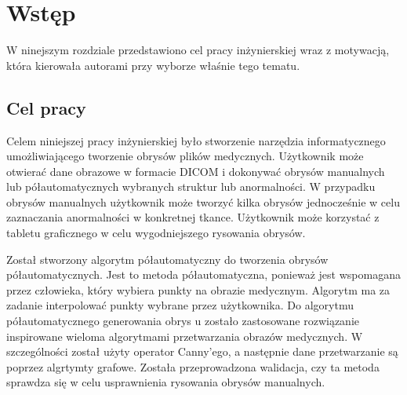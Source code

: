 \documentclass[a4paper,11pt,twoside,openright]{report}
\theoremstyle{definition}
\begin{document}
\thispagestyle{empty}
\newpage

\null\thispagestyle{empty}\newpage


\tableofcontents
\thispagestyle{empty}


\null\thispagestyle{empty}\newpage
\pagestyle{fancy}
\setcounter{page}{11} %

\chapter*{Wstęp}

W ninejszym rozdziale przedstawiono cel pracy inżynierskiej wraz z motywacją,
która kierowała autorami przy wyborze właśnie tego tematu.

\section*{Cel pracy}

Celem niniejszej pracy inżynierskiej było stworzenie narzędzia informatycznego
umożliwiającego tworzenie obrysów plików medycznych. Użytkownik może otwierać
dane obrazowe w formacie DICOM i dokonywać obrysów manualnych lub półautomatycznych
wybranych struktur lub anormalności. W przypadku obrysów manualnych użytkownik
może tworzyć kilka obrysów jednocześnie w celu zaznaczania anormalności w konkretnej tkance.
Użytkownik może korzystać z tabletu graficznego w celu wygodniejszego rysowania obrysów.

Został stworzony algorytm półautomatyczny do tworzenia obrysów półautomatycznych.
Jest to metoda półautomatyczna, ponieważ jest wspomagana przez człowieka, który
wybiera punkty na obrazie medycznym. Algorytm ma za zadanie interpolować punkty
wybrane przez użytkownika. Do algorytmu półautomatycznego generowania obrys
u zostało zastosowane rozwiązanie inspirowane wieloma algorytmami przetwarzania
obrazów medycznych. W szczególności został użyty operator Canny'ego, a następnie
dane przetwarzanie są poprzez algrtymty grafowe. Została przeprowadzona walidacja,
czy ta metoda sprawdza się w celu usprawnienia rysowania obrysów manualnych.
\end{document}
